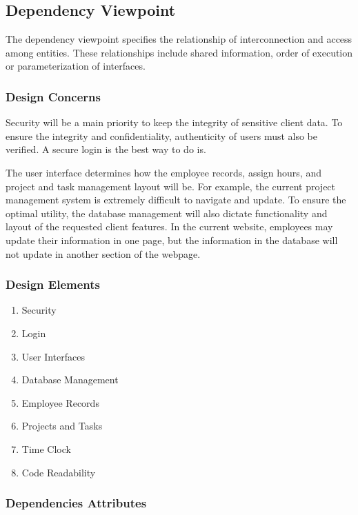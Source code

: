 \documentclass[letterpaper,10pt,titlepage,journal,compsoc,draftclsnofoot,onecolumn]{IEEEtran}
\newcommand\tab[1][1cm]{\hspace*{#1}}
\begin{document}
\subsection{Dependency Viewpoint}

\tab The dependency viewpoint specifies the relationship of interconnection and access among entities. These relationships include shared information, order of execution or parameterization of interfaces.

\subsubsection{Design Concerns}

\tab
Security will be a main priority to keep the integrity of sensitive client data. To ensure the integrity and confidentiality, authenticity of users must also be verified. A secure login is the best way to do is.\newline


\tab
The user interface determines how the employee records, assign hours, and project and task management layout will be. For example, the current project management system is extremely difficult to navigate and update. To ensure the optimal utility, the database management will also dictate functionality and layout of the requested client features. In the current website, employees may update their information in one page, but the information in the database will not update in another section of the webpage. 

\subsubsection{Design Elements}

\begin{enumerate}
\item{Security}
\item{Login}
\item{User Interfaces}
\item{Database Management}
\item{Employee Records}
\item{Projects and Tasks}
\item{Time Clock}
\item{Code Readability}
\end{enumerate}

\subsubsection{Dependencies Attributes}
\end{document}
